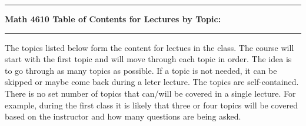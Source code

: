 \documentclass[10pt,fleqn]{article}
\begin{document}
\vskip0.1in\hrule\vskip0.1in
\noindent
{\bf Math 4610 Table of Contents for Lectures by Topic:}
\vskip0.1in\hrule\vskip0.1in
\noindent
The topics listed below form the content for lectues in the class. The course
will start with the first topic and will move through each topic in order. The
idea is to go through as many topics as possible. If a topic is not needed, it
can be skipped or maybe come back during a leter lecture. The topics are
self-contained. There is no set number of topics that can/will be covered in a
single lecture. For example, during the first class it is likely that three or
four topics will be covered based on the instructor and how many questions are
being asked.
\end{document}
